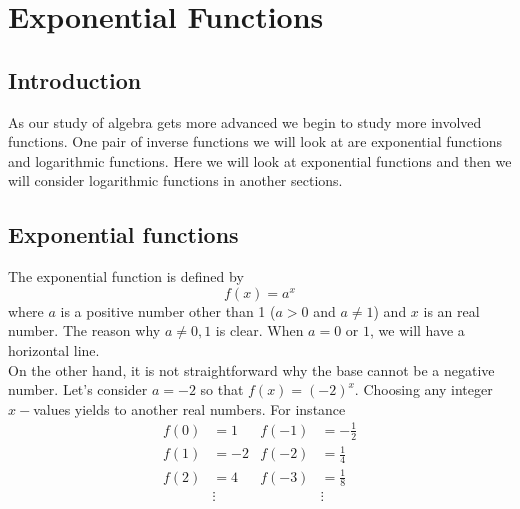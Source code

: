 \chapter{Exponential Functions}
\section{Introduction}
As our study of algebra gets more advanced we begin to study more involved
functions. One pair of inverse functions we will look at are exponential functions
and logarithmic functions. Here we will look at exponential functions and then we
will consider logarithmic functions in another sections.
\section{Exponential functions}
The exponential function is defined by 
\begin{equation}
	f(x) = a^x
	 \label{exp}
\end{equation}
where $a$ is a positive number other than 1 ($a>0$ and $a\neq1$) and $x$ is an real number. The
reason why $a\neq 0,1$ is clear. When $a=0$ or $1$, we will have a horizontal line. \\
On the other hand, it is not straightforward why the base cannot be a negative number. Let's
consider $a=-2$ so that $f(x)=(-2)^x$. Choosing any integer $x-$values yields to another real
numbers. For instance
		\begin{align*}
			f(0) &= 1		&		f(-1) &= -\frac{1}{2} \\
			f(1) &= -2		&		f(-2) &= \frac{1}{4} \\
			f(2) &= 4		&		f(-3) &= \frac{1}{8} \\
				&\vdots		&			&\vdots
		\end{align*}

